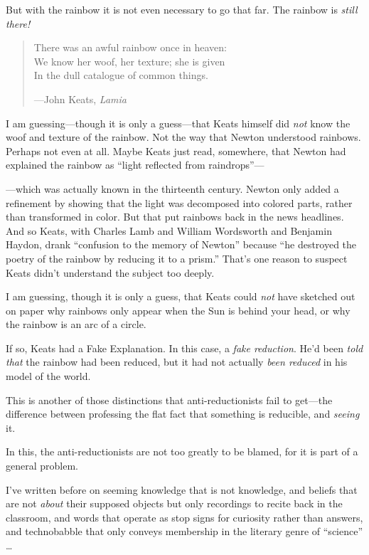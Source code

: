 {
 But with the rainbow it is not even necessary to go that far. The
rainbow is \textit{still there!}}

\myendsectiontext



\begin{verse}
 There was an awful rainbow once in heaven:\\
 We know her woof, her texture; she is given\\
 In the dull catalogue of common things.\\
{\raggedleft
 {}---John Keats, \textit{Lamia}
 \par}
\end{verse}


{
 I am guessing---though it is only a guess---that Keats himself did
\textit{not} know the woof and texture of the rainbow. Not the way that
Newton understood rainbows. Perhaps not even at all. Maybe Keats just
read, somewhere, that Newton had explained the rainbow as
``light reflected from
raindrops''---}

{
 {}---which was actually known in the thirteenth century. Newton
only added a refinement by showing that the light was decomposed into
colored parts, rather than transformed in color. But that put rainbows
back in the news headlines. And so Keats, with Charles Lamb and William
Wordsworth and Benjamin Haydon, drank ``confusion to
the memory of Newton'' because ``he
destroyed the poetry of the rainbow by reducing it to a
prism.'' That's one reason to suspect
Keats didn't understand the subject too deeply.}

{
 I am guessing, though it is only a guess, that Keats could
\textit{not} have sketched out on paper why rainbows only appear when
the Sun is behind your head, or why the rainbow is an arc of a circle.}

{
 If so, Keats had a Fake Explanation. In this case, a \textit{fake
reduction}. He'd been \textit{told that} the rainbow
had been reduced, but it had not actually \textit{been reduced} in his
model of the world.}

{
 This is another of those distinctions that anti-reductionists fail
to get---the difference between professing the flat fact that something
is reducible, and \textit{seeing} it.}

{
 In this, the anti-reductionists are not too greatly to be blamed,
for it is part of a general problem.}

{
 I've written before on seeming knowledge that is
not knowledge, and beliefs that are not \textit{about} their supposed
objects but only recordings to recite back in the classroom, and words
that operate as stop signs for curiosity rather than answers, and
technobabble that only conveys membership in the literary genre of
``science'' \ldots}

